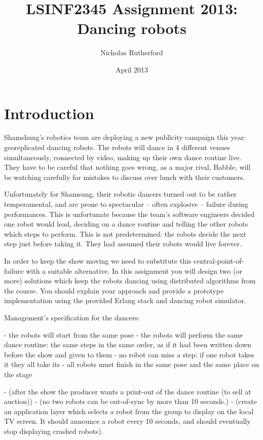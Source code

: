 \documentclass[a4paper]{article}
\title{LSINF2345 Assignment 2013: Dancing robots}
\author{Nicholas Rutherford}
\date{April 2013}
\begin{document}
\lstset{language=erlang}

\ifpdf
{}
\else
{}
\fi

\maketitle


\section{Introduction}

Shamshung's robotics team are deploying a new publicity campaign this year:
georeplicated dancing robots. The robots will dance in 4 different venues
simultaneously, connected by video, making up their own dance routine live.
They have to be careful that nothing goes wrong, as a major rival,
Babble, will be watching carefully for mistakes to discuss over lunch with
their customers.

Unfortunately for Shamsung, their robotic dancers turned out to be rather
temperamental, and are prone to spectacular -- often explosive -- failure
during performances. This is unfortunate because the team's software engineers
decided one robot would lead, deciding on a dance routine and telling the
other robots which steps to perform. This is not predetermined: the robots
decide the next step just before taking it. They had assumed their robots
would live forever.

In order to keep the show moving we need to substitute this
central-point-of-failure with a suitable alternative. In this assignment you
will design two (or more) solutions which keep the robots dancing using
distributed algorithms from the course. You should explain your approach and
provide a prototype implementation using the provided Erlang stack and
dancing robot simulator.

Management's specification for the dancers:

  - the robots will start from the same pose
  - the robots will perform the same dance routine: the same steps in the same order,
    as if it had been written down before the show and given to them
  - no robot can miss a step: if one robot takes it they all take its
  - all robots must finish in the same pose and the same place on the stage

  - (after the show the producer wants a print-out of the dance routine (to sell at auction))
  - (no two robots can be out-of-sync by more than 10 seconds.)
  - (create an application layer which selects a robot from the group to
      display on the local TV screen. It should announce a robot every 10 seconds,
      and should eventually stop displaying crashed robots).
\end{document}
